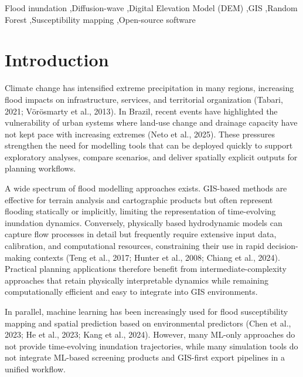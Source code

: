 \documentclass[a4paper,fleqn]{cas-dc}
\begin{document}
\begin{keywords}
Flood inundation \sep Diffusion-wave \sep Digital Elevation Model (DEM) \sep GIS \sep Random Forest \sep Susceptibility mapping \sep Open-source software
\end{keywords}


\maketitle

\section{Introduction}

Climate change has intensified extreme precipitation in many regions, increasing flood impacts on infrastructure, services, and territorial organization (Tabari, 2021; V\"or\"osmarty et al., 2013). In Brazil, recent events have highlighted the vulnerability of urban systems where land-use change and drainage capacity have not kept pace with increasing extremes (Neto et al., 2025). These pressures strengthen the need for modelling tools that can be deployed quickly to support exploratory analyses, compare scenarios, and deliver spatially explicit outputs for planning workflows.

A wide spectrum of flood modelling approaches exists. GIS-based methods are effective for terrain analysis and cartographic products but often represent flooding statically or implicitly, limiting the representation of time-evolving inundation dynamics. Conversely, physically based hydrodynamic models can capture flow processes in detail but frequently require extensive input data, calibration, and computational resources, constraining their use in rapid decision-making contexts (Teng et al., 2017; Hunter et al., 2008; Chiang et al., 2024). Practical planning applications therefore benefit from intermediate-complexity approaches that retain physically interpretable dynamics while remaining computationally efficient and easy to integrate into GIS environments.

In parallel, machine learning has been increasingly used for flood susceptibility mapping and spatial prediction based on environmental predictors (Chen et al., 2023; He et al., 2023; Kang et al., 2024). However, many ML-only approaches do not provide time-evolving inundation trajectories, while many simulation tools do not integrate ML-based screening products and GIS-first export pipelines in a unified workflow.
\end{document}
